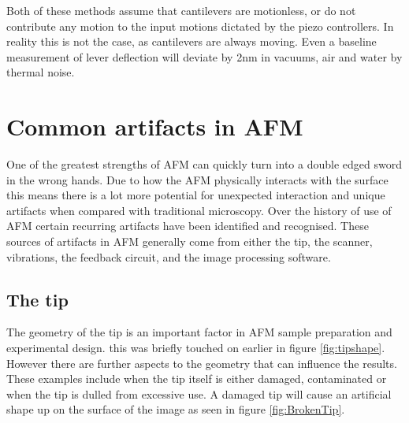 Both of these methods assume that cantilevers are motionless, or do not contribute any motion to the input motions dictated by the piezo controllers. In reality this is not the case, as cantilevers are always moving. Even a baseline measurement of lever deflection will deviate by 2nm in vacuums, air and water by thermal noise.\cite{AFMTalk} \cite{AFMCalibration, AFMCalibration2}








\section{Common artifacts in AFM}
\label{chap:commonArtifacts}

One of the greatest strengths of AFM can quickly turn into a double edged sword in the wrong hands. Due to how the AFM physically interacts with the surface this means there is a lot more potential for unexpected interaction and unique artifacts when compared with traditional microscopy. Over the history of use of AFM certain recurring artifacts have been identified and recognised. These sources of artifacts in AFM generally come from either the tip, the scanner, vibrations, the feedback circuit, and the image processing software. 

\subsection{The tip}

The geometry of the tip is an important factor in AFM sample preparation and experimental design. this was briefly touched on earlier in figure \ref{fig:tipshape}. However there are further aspects to the geometry that can influence the results. These examples include when the tip itself is either damaged, contaminated or when the tip is dulled from excessive use. A damaged tip will cause an artificial shape up on the surface of the image as seen in figure \ref{fig:BrokenTip}. 

